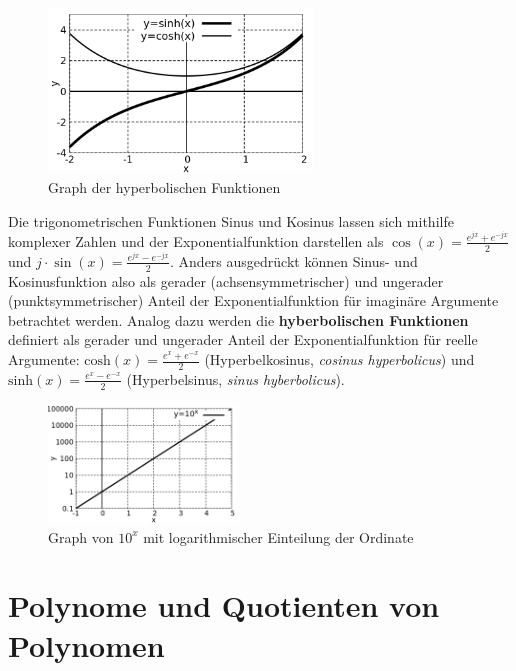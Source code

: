 \begin{minipage}[t]{1\textwidth}
    \begin{figure}
        \centering
        \includegraphics[width=7cm]{./gnuplot/base-function-hyp}
        \caption{Graph der hyperbolischen Funktionen}
        \label{fig:ExBaseFunHyperbolic}
    \end{figure}
    Die trigonometrischen Funktionen Sinus und Kosinus lassen sich mithilfe komplexer Zahlen und der Exponentialfunktion darstellen als $\cos(x) = \frac{e^{jx}+e^{-jx}}{2}$ und $j\cdot \sin(x) = \frac{e^{jx}-e^{-jx}}{2}$. Anders ausgedrückt können Sinus- und Kosinusfunktion also als gerader (achsensymmetrischer) und ungerader (punktsymmetrischer) Anteil der Exponentialfunktion für imaginäre Argumente betrachtet werden. Analog dazu werden die \textbf{hyberbolischen Funktionen} definiert als gerader und ungerader Anteil der Exponentialfunktion für reelle Argumente: $\text{cosh}(x) = \frac{e^x+e^{-x}}{2}$ (Hyperbelkosinus, \emph{cosinus hyperbolicus}) und $\text{sinh}(x) = \frac{e^x-e^{-x}}{2}$ (Hyperbelsinus, \emph{sinus hyberbolicus}).
\end{minipage}


\begin{figure}
    \centering
    \includegraphics[width=0.45\textwidth]{./gnuplot/log-scale-plot}
    \caption[Logarithmische Achseneinteilung]{Graph von $10^x$ mit logarithmischer Einteilung der Ordinate}
    \label{fig:LogScalePlot}
\end{figure}

\clearpage

\section{Polynome und Quotienten von Polynomen}

